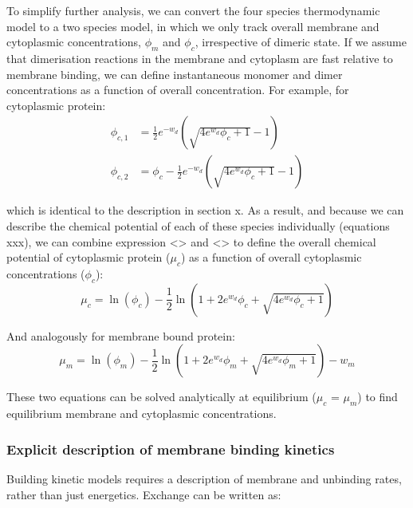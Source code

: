 \documentclass[12pt]{"article"}
\begin{document}
To simplify further analysis, we can convert the four species thermodynamic model to a two species model, in which we only track overall membrane and cytoplasmic concentrations, $\phi_m$ and $\phi_c$, irrespective of dimeric state. If we assume that dimerisation reactions in the membrane and cytoplasm are fast relative to membrane binding, we can define instantaneous monomer and dimer concentrations as a function of overall concentration. For example, for cytoplasmic protein:
\begin{align}
\phi_{c,1} &= \frac{1}{2}e^{-w_d}\left(\sqrt{4e^{w_d}\phi_c + 1} - 1\right)\\
\phi_{c,2} &= \phi_c - \frac{1}{2}e^{-w_d}\left(\sqrt{4e^{w_d}\phi_c + 1} - 1\right)
\end{align}

which is identical to the description in section x. As a result, and because we can describe the chemical potential of each of these species individually (equations xxx), we can combine expression <> and <> to define the overall chemical potential of cytoplasmic protein ($\mu_c$) as a function of overall cytoplasmic concentrations ($\phi_c$):
\begin{equation}
\mu_c = \ln(\phi_c) - \frac{1}{2}\ln\left(1 + 2e^{w_d}\phi_c + \sqrt{4e^{w_d}\phi_c + 1}\right)
\end{equation}

And analogously for membrane bound protein: 
\begin{equation}
\mu_m = \ln(\phi_m) - \frac{1}{2}\ln\left(1 + 2e^{w_d}\phi_m + \sqrt{4e^{w_d}\phi_m + 1}\right) - w_m
\end{equation}

These two equations can be solved analytically at equilibrium ($\mu_c$ = $\mu_m$) to find equilibrium membrane and cytoplasmic concentrations.


\subsubsection{Explicit description of membrane binding kinetics} 

Building kinetic models requires a description of membrane and unbinding rates, rather than just energetics. Exchange can be written as:

\begin{center}
\end{center}
\end{document}
